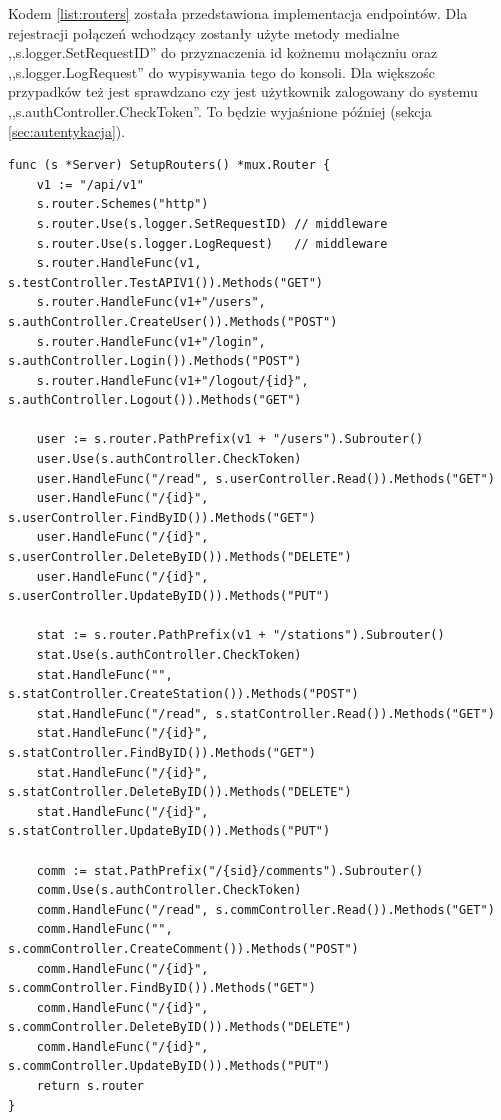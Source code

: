 Kodem \ref{list:routers} została przedstawiona implementacja endpointów.
Dla rejestracji połączeń wchodzący zostanły użyte metody medialne ,,s.logger.SetRequestID'' do przyznaczenia id kożnemu mołączniu oraz ,,s.logger.LogRequest'' do wypisywania tego do konsoli.
Dla większośc przypadków też jest sprawdzano czy jest użytkownik zalogowany do systemu ,,s.authController.CheckToken''. To będzie wyjaśnione później (sekcja \ref{sec:autentykacja}).
\begin{lstlisting}[label=list:routers,caption=Implementacja punktów końcowych,basicstyle=\tiny\ttfamily]
func (s *Server) SetupRouters() *mux.Router {
	v1 := "/api/v1"
	s.router.Schemes("http")
	s.router.Use(s.logger.SetRequestID) // middleware
	s.router.Use(s.logger.LogRequest)   // middleware
	s.router.HandleFunc(v1, s.testController.TestAPIV1()).Methods("GET")
	s.router.HandleFunc(v1+"/users", s.authController.CreateUser()).Methods("POST")
	s.router.HandleFunc(v1+"/login", s.authController.Login()).Methods("POST")
	s.router.HandleFunc(v1+"/logout/{id}", s.authController.Logout()).Methods("GET")

	user := s.router.PathPrefix(v1 + "/users").Subrouter()
	user.Use(s.authController.CheckToken)
	user.HandleFunc("/read", s.userController.Read()).Methods("GET")
	user.HandleFunc("/{id}", s.userController.FindByID()).Methods("GET")
	user.HandleFunc("/{id}", s.userController.DeleteByID()).Methods("DELETE")
	user.HandleFunc("/{id}", s.userController.UpdateByID()).Methods("PUT")

	stat := s.router.PathPrefix(v1 + "/stations").Subrouter()
	stat.Use(s.authController.CheckToken)
	stat.HandleFunc("", s.statController.CreateStation()).Methods("POST")
	stat.HandleFunc("/read", s.statController.Read()).Methods("GET")
	stat.HandleFunc("/{id}", s.statController.FindByID()).Methods("GET")
	stat.HandleFunc("/{id}", s.statController.DeleteByID()).Methods("DELETE")
	stat.HandleFunc("/{id}", s.statController.UpdateByID()).Methods("PUT")

	comm := stat.PathPrefix("/{sid}/comments").Subrouter()
	comm.Use(s.authController.CheckToken)
	comm.HandleFunc("/read", s.commController.Read()).Methods("GET")
	comm.HandleFunc("", s.commController.CreateComment()).Methods("POST")
	comm.HandleFunc("/{id}", s.commController.FindByID()).Methods("GET")
	comm.HandleFunc("/{id}", s.commController.DeleteByID()).Methods("DELETE")
	comm.HandleFunc("/{id}", s.commController.UpdateByID()).Methods("PUT")
	return s.router
}
\end{lstlisting}

